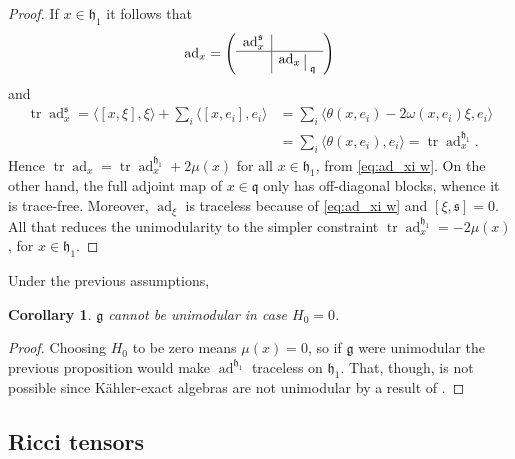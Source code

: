 \documentclass[12pt, twoside]{amsart}
\def\g{\mathfrak{g}}
\def\h{\mathfrak{h}}
\def\q{\mathfrak{q}}
\def\s{\mathfrak s}
\def\ad{\operatorname{ad}}
\def\tr{\operatorname{tr}}
\newcommand{\restr}{\raisebox{-.2em}{$\!\big\arrowvert$}}
\newtheorem{coro}[definition]{Corollary}
\theoremstyle{definition}
\begin{document}
\begin{proof}
If  $x\in \h_1$ it follows that 
\[
\ad_{x}=
\left(\begin{array}{c|c}
          \ad^{\s}_x  & \\          \hline 
        & \ad_{x}\restr_{\q}
        \end{array}\right)
\]
and 
\begin{equation*}\begin{split}
    \tr \ad^{\s} _{x}= \langle [x,\xi],\xi \rangle+ {\textstyle\sum}_i \langle [x, e_i],e_i \rangle
   & ={\textstyle\sum}_i \langle \theta(x,e_i) -2 \omega(x,e_i)\xi , e_i \rangle \\
   & ={\textstyle\sum}_i \langle \theta(x,e_i),e_i \rangle
    =\tr\ad^{\h_1} _{x}.
\end{split}\end{equation*}
Hence  $\tr \ad_{x}=\tr \ad^{\h_1} _{x}+2\mu(x)$ for all $x \in \h_1$, from \eqref{eq:ad_xi w}. On the other hand, the full adjoint map of  $x \in {\q}$ only has off-diagonal blocks, whence it is trace-free.
Moreover, $\ad_{\xi}$ is traceless because of \eqref{eq:ad_xi w} and $[\xi , \s]=0$. All that reduces the unimodularity to the simpler constraint 
$\tr \ad^{\h_1} _{x}=-2\mu(x)$, for $x \in \h_1$.
\end{proof}

\smallskip

Under the previous assumptions, 
\begin{coro}
$\g$ cannot be unimodular in case $H_0=0$.  
\end{coro}
\begin{proof} 
Choosing $H_0$ to be zero means $\mu(x)=0$, so if $\g$ were unimodular the previous proposition would make $\ad^{\h_1}$ traceless on $\h_1$. That, though,  is not possible since K{\"a}hler-exact algebras are not unimodular by a result of \cite{frob}. 
\end{proof}

\bigbreak 

\subsection{Ricci tensors}\label{sec: ricci} 
\medbreak
\end{document}
